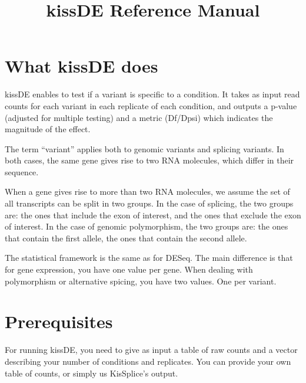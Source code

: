 \documentclass[english, a4paper, 12pt]{article}
\title{kissDE Reference Manual}
\author{}
\begin{document}
\maketitle

\section{What kissDE does}
kissDE enables to test if a variant is specific to a condition.
It takes as input read counts for each variant in each replicate of each condition, and outputs a p-value (adjusted for multiple testing) and a metric (Df/Dpsi) which indicates the magnitude of the effect.

The term ``variant'' applies both to genomic variants and splicing variants.
In both cases, the same gene gives rise to two RNA molecules, which differ in their sequence.

When a gene gives rise to more than two RNA molecules, we assume the set of all transcripts can be split in two groups.
In the case of splicing, the two groups are: the ones that include the exon of interest, and the ones that exclude the exon of interest.
In the case of genomic polymorphism, the two groups are: the ones that contain the first allele, the ones that contain the second allele.

The statistical framework is the same as for DESeq.
The main difference is that for gene expression, you have one value per gene. 
When dealing with polymorphism or alternative spicing, you have two values. One per variant.



\section{Prerequisites}
For running kissDE, you need to give as input a table of raw counts and a vector describing your number of conditions and replicates.
You can provide your own table of counts, or simply us KisSplice's output.
\end{document}
